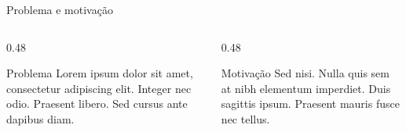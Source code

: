\begin{frame}{Problema e motivação}
  \begin{columns}[T,onlytextwidth]
    \begin{column}{0.48\textwidth}
      \begin{block}{Problema}
        Lorem ipsum dolor sit amet, consectetur adipiscing elit. Integer nec
        odio. Praesent libero. Sed cursus ante dapibus diam.
      \end{block}
    \end{column}
    \begin{column}{0.48\textwidth}
      \begin{block}{Motivação}
        Sed nisi. Nulla quis sem at nibh elementum imperdiet. Duis sagittis
        ipsum. Praesent mauris fusce nec tellus.
      \end{block}
    \end{column}
  \end{columns}
\end{frame}